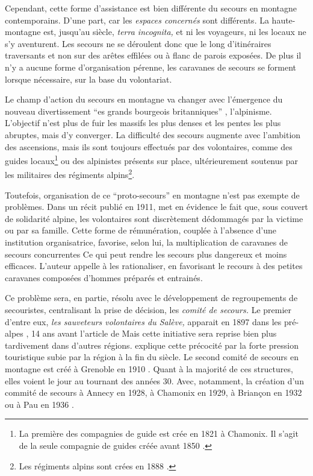 Cependant, cette forme d'assistance est bien différente du secours en
montagne contemporains. D'une part, car les \emph{espaces concernés}
sont différents. La haute-montagne est, jusqu'au 
siècle, \emph{terra incognita,} et ni les voyageurs, ni les locaux ne
s'y aventurent. Les secours ne se déroulent donc que le long
d'itinéraires traversants et non sur des arêtes effilées ou à flanc de
parois exposées. De plus il n'y a aucune forme d'organisation pérenne,
les caravanes de secours se forment lorsque nécessaire, sur la base du
volontariat.

Le champ d'action du secours en montagne va changer avec l’émergence
du nouveau divertissement \enquote{es grands bourgeois
  britanniques} \autocite{Descamps2018}, l'alpinisme. L'objectif n'est
plus de fuir les massifs les plus denses et les pentes les plus
abruptes, mais d'y converger.  La difficulté des secours augmente avec
l'ambition des ascensions, mais ils sont toujours effectués par des
volontaires, comme des guides locaux\footnote{La première des
  compagnies de guide est crée en 1821 à Chamonix. Il s'agit de la
  seule compagnie de guides créée avant 1850
  \autocite{ContributeursWikipedia2020b}.} ou des alpinistes présents
sur place, ultérieurement soutenus par les militaires des régiments
alpins\footnote{Les régiments alpins sont crées en 1888
  \autocite{Mezin2016}.}.

Toutefois, organisation de ce \enquote{proto-secours} en montagne
n'est pas exempte de problèmes. Dans un récit publié en 1911,
 \autocite{Thomas1911} met en évidence le fait que, sous
couvert de solidarité alpine, les volontaires sont discrètement
dédommagés par la victime ou par sa famille. Cette forme de
rémunération, couplée à l'absence d'une institution organisatrice,
favorise, selon lui, la multiplication de caravanes de secours
concurrentes Ce qui peut rendre les secours plus dangereux et moins
efficaces. L'auteur appelle à les rationaliser, en favorisant le
recours à des petites caravanes composées d'hommes préparés et
entrainés.

Ce problème sera, en partie, résolu avec le développement de
regroupements de secouristes, centralisant la prise de décision, les
\emph{comité de secours.} Le premier d'entre eux, \emph{les sauveteurs
  volontaires du Salève,} apparait en 1897 dans les pré-alpes
\autocite{CFDLD}, 14 ans avant l'article de  Mais cette
initiative sera reprise bien plus tardivement dans d'autres
régions. \textcite{Caille2016} explique cette précocité par la forte
pression touristique subie par la région à la fin du 
siècle.  Le second comité de secours en montagne est créé à Grenoble
en 1910 \autocite{CFDLD,Caille2016}. Quant à la majorité de ces
structures, elles voient le jour au tournant des années 30. Avec,
notamment, la création d'un commité de secours à Annecy en 1928, à
Chamonix en 1929, à Briançon en 1932 ou à Pau en 1936 \autocite{CFDLD,
  Devies1946}.

